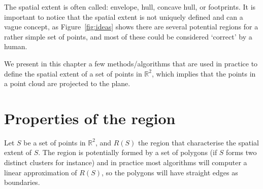 %

The spatial extent is often called: envelope, hull, concave hull, or footprints.
It is important to notice that the spatial extent is not uniquely defined and can a vague concept, as Figure~\ref{fig:ideas} shows there are several potential regions for a rather simple set of points, and most of these could be considered `correct' by a human.

%

We present in this chapter a few methods/algorithms that are used in practice to define the spatial extent of a set of points in $\mathbb{R}^2$, which implies that the points in a point cloud are projected to the plane.



%
\section{Properties of the region}
\label{sec:properties}

Let $S$ be a set of points in $\mathbb{R}^2$, and $R(S)$ the region that characterise the spatial extent of $S$.
The region is potentially formed by a set of polygons (if $S$ forms two distinct clusters for instance) and in practice most algorithms will computer a linear approximation of $R(S)$, so the polygons will have straight edges as boundaries.

